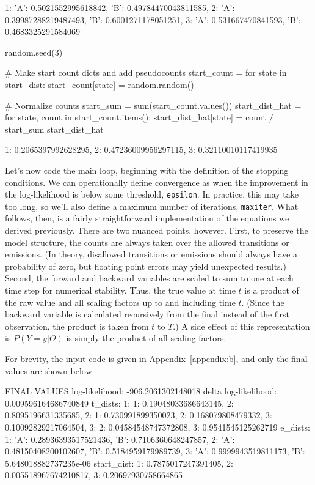 \begin{NotebookOut}
{1: {'A': 0.5021552995618842, 'B': 0.49784470043811585},
 2: {'A': 0.39987288219487493, 'B': 0.6001271178051251},
 3: {'A': 0.531667470841593, 'B': 0.4683325291584069}}
\end{NotebookOut}

\begin{NotebookIn}
random.seed(3)

# Make start count dicts and add pseudocounts
start_count = {}
for state in start_dist:
    start_count[state] = random.random()

# Normalize counts
start_sum = sum(start_count.values())
start_dist_hat = {}
for state, count in start_count.items():
    start_dist_hat[state] = count / start_sum
start_dist_hat
\end{NotebookIn}

\begin{NotebookOut}
{1: 0.2065397992628295, 2: 0.47236009956297115, 3: 0.32110010117419935}
\end{NotebookOut}

Let's now code the main loop, beginning with the definition of the stopping conditions. We can operationally define convergence as when the improvement in the log-likelihood is below some threshold, \texttt{epsilon}. In practice, this may take too long, so we'll also define a maximum number of iterations, \texttt{maxiter}. What follows, then, is a fairly straightforward implementation of the equations we derived previously. There are two nuanced points, however. First, to preserve the model structure, the counts are always taken over the allowed transitions or emissions. (In theory, disallowed transitions or emissions should always have a probability of zero, but floating point errors may yield unexpected results.) Second, the forward and backward variables are scaled to sum to one at each time step for numerical stability. Thus, the true value at time $t$ is a product of the raw value and all scaling factors up to and including time $t$. (Since the backward variable is calculated recursively from the final instead of the first observation, the product is taken from $t$ to $T$.) A side effect of this representation is $P(Y=y|\Theta)$ is simply the product of all scaling factors.

For brevity, the input code is given in Appendix~\ref{appendix:b}, and only the final values are shown below.

\begin{NotebookOut}
FINAL VALUES
log-likelihood: -906.2061302148018
delta log-likelihood: 0.009596164686740849
t_dists: {1: {1: 0.19048033686643145,
              2: 0.8095196631335685},
          2: {1: 0.730991899350023,
              2: 0.168079808479332,
              3: 0.10092829217064504},
          3: {2: 0.04584548747372808,
              3: 0.9541545125262719}}
e_dists: {1: {'A': 0.28936393517521436,
              'B': 0.7106360648247857},
          2: {'A': 0.48150408200102607,
              'B': 0.5184959179989739},
          3: {'A': 0.9999943519811173,
              'B': 5.648018882737235e-06}}
start_dist: {1: 0.7875017247391405,
             2: 0.005518967674210817,
             3: 0.20697930758664865}
\end{NotebookOut}

